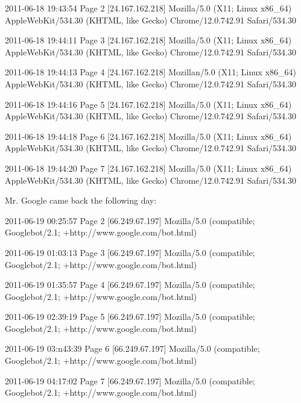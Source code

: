 \begin{wideverbatim}

  2011-06-18 19:43:54 Page 2 [24.167.162.218] Mozilla/5.0 (X11; Linux
  x86_64) AppleWebKit/534.30 (KHTML, like Gecko) Chrome/12.0.742.91
  Safari/534.30

  2011-06-18 19:44:11 Page 3 [24.167.162.218] Mozilla/5.0 (X11; Linux
  x86_64) AppleWebKit/534.30 (KHTML, like Gecko) Chrome/12.0.742.91
  Safari/534.30

  2011-06-18 19:44:13 Page 4 [24.167.162.218] Mozillan/5.0 (X11; Linux
  x86_64) AppleWebKit/534.30 (KHTML, like Gecko) Chrome/12.0.742.91
  Safari/534.30

  2011-06-18 19:44:16 Page 5 [24.167.162.218] Mozilla/5.0 (X11; Linux
  x86_64) AppleWebKit/534.30 (KHTML, like Gecko) Chrome/12.0.742.91
  Safari/534.30

  2011-06-18 19:44:18 Page 6 [24.167.162.218] Mozilla/5.0 (X11; Linux
  x86_64) AppleWebKit/534.30 (KHTML, like Gecko) Chrome/12.0.742.91
  Safari/534.30

  2011-06-18 19:44:20 Page 7 [24.167.162.218] Mozilla/5.0 (X11; Linux
  x86_64) AppleWebKit/534.30 (KHTML, like Gecko) Chrome/12.0.742.91
  Safari/534.30

\end{wideverbatim}

Mr. Google came back the following day:

\begin{wideverbatim}

  2011-06-19 00:25:57 Page 2 [66.249.67.197] Mozilla/5.0 (compatible;
  Googlebot/2.1; +http://www.google.com/bot.html)

  2011-06-19 01:03:13 Page 3 [66.249.67.197] Mozilla/5.0 (compatible;
  Googlebot/2.1; +http://www.google.com/bot.html)

  2011-06-19 01:35:57 Page 4 [66.249.67.197] Mozilla/5.0 (compatible;
  Googlebot/2.1; +http://www.google.com/bot.html)

  2011-06-19 02:39:19 Page 5 [66.249.67.197] Mozilla/5.0 (compatible;
  Googlebot/2.1; +http://www.google.com/bot.html)

  2011-06-19 03:n43:39 Page 6 [66.249.67.197] Mozilla/5.0 (compatible;
  Googlebot/2.1; +http://www.google.com/bot.html)

  2011-06-19 04:17:02 Page 7 [66.249.67.197] Mozilla/5.0 (compatible;
  Googlebot/2.1; +http://www.google.com/bot.html)

\end{wideverbatim}

